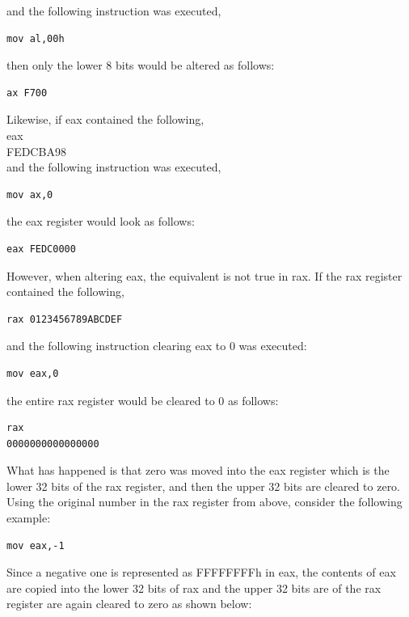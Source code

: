 \documentclass[10pt]{article}
\begin{document}
and the following instruction was executed,

\begin{verbatim}
mov al,00h
\end{verbatim}

then only the lower 8 bits would be altered as follows:

\begin{verbatim}
ax F700
\end{verbatim}

Likewise, if eax contained the following,\\
eax\\
FEDCBA98\\
and the following instruction was executed,

\begin{verbatim}
mov ax,0
\end{verbatim}

the eax register would look as follows:

\begin{verbatim}
eax FEDC0000
\end{verbatim}

However, when altering eax, the equivalent is not true in rax. If the rax register contained the following,

\begin{verbatim}
rax 0123456789ABCDEF
\end{verbatim}

and the following instruction clearing eax to 0 was executed:

\begin{verbatim}
mov eax,0
\end{verbatim}

the entire rax register would be cleared to 0 as follows:

\begin{verbatim}
rax
0000000000000000
\end{verbatim}

What has happened is that zero was moved into the eax register which is the lower 32 bits of the rax register, and then the upper 32 bits are cleared to zero. Using the original number in the rax register from above, consider the following example:

\begin{verbatim}
mov eax,-1
\end{verbatim}

Since a negative one is represented as FFFFFFFFh in eax, the contents of eax are copied into the lower 32 bits of rax and the upper 32 bits are of the rax register are again cleared to zero as shown below:
\end{document}
